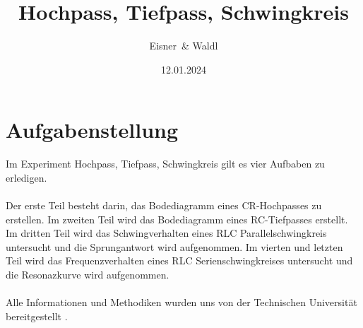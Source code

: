 \documentclass[12pt,a4paper,twoside]{article}
\begin{document}
\newcommand\laboratorynumber{2}
\title{Hochpass, Tiefpass, Schwingkreis}
\newcommand\supervisor{Ditlbacher, Harald}
\newcommand\groupnumber{42}

\newcommand\participantonelastname{Eisner}
\newcommand\participantonefirstname{Nico}
\newcommand\participantoneid{12214121}
\newcommand\participanttwolastname{Waldl}
\newcommand\participanttwofirstname{Philip}
\newcommand\participanttwoid{12214120}
\author{\participantonelastname \ \& \participanttwolastname}

\newcommand\degreeid{UB 033 678}
\newcommand\semester{23WS}
\date{12.01.2024}

\newcommand\coursetitle{Laborübungen 2: \\ Elektrizität, Magnetismus, Optik}

%



\tableofcontents
\newpage

\section{Aufgabenstellung} %
Im Experiment Hochpass, Tiefpass, Schwingkreis gilt es vier Aufbaben zu erledigen. 
\\
\\
Der erste Teil besteht darin, das Bodediagramm eines CR-Hochpasses zu erstellen. 
Im zweiten Teil wird das Bodediagramm eines RC-Tiefpasses erstellt. 
Im dritten Teil wird das Schwingverhalten eines RLC Parallelschwingkreis untersucht und die Sprungantwort wird aufgenommen. 
Im vierten und letzten Teil wird das Frequenzverhalten  eines RLC Serienschwingkreises untersucht und die Resonazkurve wird aufgenommen. 
\\
\\
Alle Informationen und Methodiken wurden uns von der Technischen Universität bereitgestellt \cite{teachcenter2}. 
\end{document}
